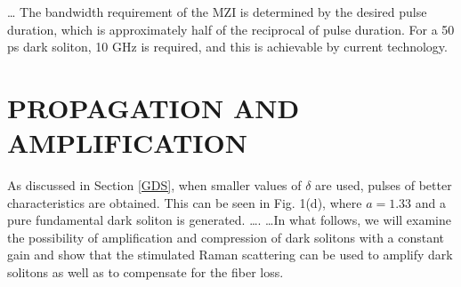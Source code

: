 \ldots
The bandwidth requirement of the MZI is determined by the desired pulse
duration, which is approximately half of the reciprocal of pulse duration.
For a 50 ps dark soliton, 10 GHz is required, and this is achievable by
current technology.



\section{PROPAGATION AND AMPLIFICATION}
\label{PAA}
As discussed in Section \ref{GDS}, when smaller values of $ \delta $ are
used, pulses of better characteristics are obtained.  This can be seen in
Fig. 1(d),  where $ a  =  1.33 $ and a pure fundamental dark soliton is
generated. \ldots .   \ldots In what follows, we will examine the
possibility of amplification and compression of dark solitons with a
constant gain and show that the stimulated Raman scattering can be used to
amplify dark solitons as well as to compensate for the fiber loss.

